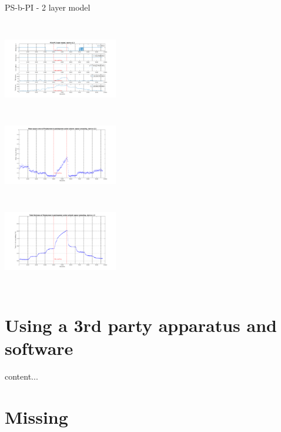 \documentclass[10pt]{beamer}
\begin{document}
\begin{frame}{PS-b-PI - 2 layer model}
\begin{columns}[t]
	\centering
	\includegraphics[width=5cm,height=3.5cm]{Results_2layer_PSbPI_n15.png}\\
	\centering
	\includegraphics[width=5cm,height=4cm]{MSE_2layer_PSbPI_n15.png}\\
	\includegraphics[width=5cm,height=3.5cm]{total_thickness_2layer_PSbPI_n15.png}
\end{columns}
\end{frame}
	
	\section{Using a 3rd party apparatus and software}
\begin{frame}{}
content...
\end{frame}

\section{Missing}
\end{document}
